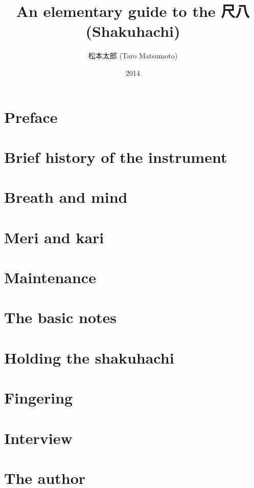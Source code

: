 \documentclass[b5paper]{memoir}
\begin{document}


\cleardoublepage

\frontmatter

\title{\Huge An elementary guide to the 尺八 (Shakuhachi)}
\author{\huge 松本太郎 (Taro Matsumoto)}
\date{\Large 2014}
\maketitle

\cleardoublepage

\tableofcontents
\listoffigures

\cleardoublepage

\section{Preface}


\cleardoublepage

\mainmatter

\section{Brief history of the instrument}


\section{Breath and mind}


\section{Meri and kari}




\enlargethispage{-2.0cm}

\section{Maintenance}


\section{The basic notes}


\section{Holding the shakuhachi}


\appendix
\appendixpage

\section{Fingering}


\section{Interview}


\clearpage

\section{The author}


\backmatter
\end{document}
